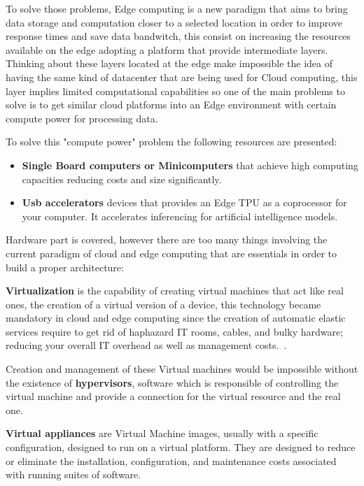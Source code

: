 To solve those problems, Edge computing is a new paradigm that aims to bring data storage and computation closer to a selected location in order to improve response times and save data bandwitch, this consist on increasing the resources available on the edge adopting a platform that provide intermediate layers.
Thinking about these layers located at the edge make impossible the idea of having the same kind of datacenter that are being used for Cloud computing, this layer implies limited computational capabilities so one of the main problems to solve is to get similar cloud platforms into an Edge environment with certain compute power for processing data.

\newpage
To solve this "compute power" problem the following resources are presented:
\begin{itemize}
  \item \textbf{Single Board computers or Minicomputers} that achieve high computing capacities reducing costs and size significantly.
  \item \textbf{Usb accelerators} devices that provides an Edge TPU as a coprocessor for your computer. It accelerates inferencing for artificial intelligence models.
\end{itemize}

Hardware part is covered, however there are too many things involving the current paradigm of cloud and edge computing that are essentials in order to build a proper architecture:

\textbf{Virtualization} is the capability of creating virtual machines that act like real ones, the creation of a virtual version of a device, this technology became mandatory in cloud and edge computing since the creation of automatic elastic services require to get rid of haphazard IT rooms, cables, and bulky hardware; reducing your overall IT overhead as well as management costs.~\cite{virt_def}.

Creation and management of these Virtual machines would be impossible without the existence of \textbf{hypervisors}, software which is responsible of controlling the virtual machine and provide a connection for the virtual resource and the real one.

\textbf{Virtual appliances} are Virtual Machine images, usually with a specific configuration, designed to run on a virtual platform. They are designed to reduce or eliminate the installation, configuration, and maintenance costs associated with running suites of software.~\cite{GEN:Virtualization:2010}

